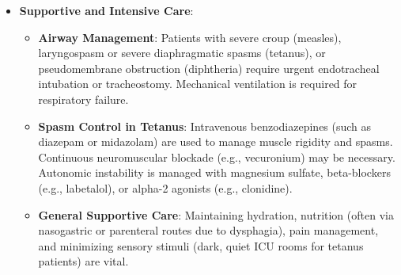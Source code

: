 \begin{itemize}
\begin{itemize}
        \item \textbf{Measles Immunotherapy}: High-dose oral or parenteral Vitamin A is recommended by the WHO for all children with acute measles, as it reduces the risk of blindness, croup, and pneumonia, and significantly lowers mortality rates.
    \end{itemize}
    \item \textbf{Supportive and Intensive Care}:
    \begin{itemize}
        \item \textbf{Airway Management}: Patients with severe croup (measles), laryngospasm or severe diaphragmatic spasms (tetanus), or pseudomembrane obstruction (diphtheria) require urgent endotracheal intubation or tracheostomy. Mechanical ventilation is required for respiratory failure.
        \item \textbf{Spasm Control in Tetanus}: Intravenous benzodiazepines (such as diazepam or midazolam) are used to manage muscle rigidity and spasms. Continuous neuromuscular blockade (e.g., vecuronium) may be necessary. Autonomic instability is managed with magnesium sulfate, beta-blockers (e.g., labetalol), or alpha-2 agonists (e.g., clonidine).
        \item \textbf{General Supportive Care}: Maintaining hydration, nutrition (often via nasogastric or parenteral routes due to dysphagia), pain management, and minimizing sensory stimuli (dark, quiet ICU rooms for tetanus patients) are vital.
    \end{itemize}
\end{itemize}

